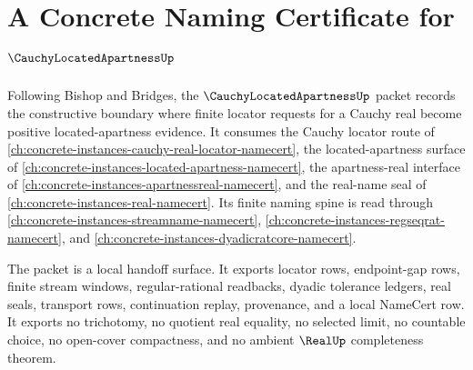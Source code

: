 \chapter{A Concrete Naming Certificate for $\CauchyLocatedApartnessUp$}
\label{ch:concrete-instances-cauchy-located-apartness-namecert}

Following Bishop and Bridges, the $\CauchyLocatedApartnessUp$ packet records the constructive boundary where finite locator requests for a Cauchy real become positive located-apartness evidence. It consumes the Cauchy locator route of \autoref{ch:concrete-instances-cauchy-real-locator-namecert}, the located-apartness surface of \autoref{ch:concrete-instances-located-apartness-namecert}, the apartness-real interface of \autoref{ch:concrete-instances-apartnessreal-namecert}, and the real-name seal of \autoref{ch:concrete-instances-real-namecert}. Its finite naming spine is read through \autoref{ch:concrete-instances-streamname-namecert}, \autoref{ch:concrete-instances-regseqrat-namecert}, and \autoref{ch:concrete-instances-dyadicratcore-namecert}.

The packet is a local handoff surface. It exports locator rows, endpoint-gap rows, finite stream windows, regular-rational readbacks, dyadic tolerance ledgers, real seals, transport rows, continuation replay, provenance, and a local NameCert row. It exports no trichotomy, no quotient real equality, no selected limit, no countable choice, no open-cover compactness, and no ambient $\RealUp$ completeness theorem.

